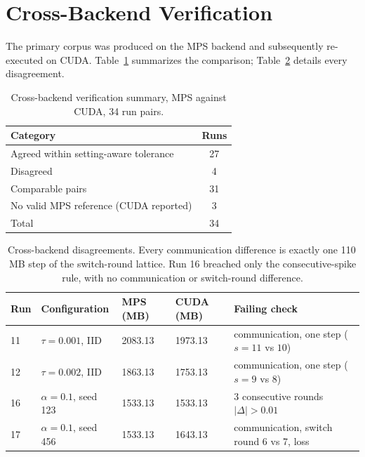 \documentclass{ieeetj}
\begin{document}
\section{Cross-Backend Verification}
\label{app:crossbackend}

The primary corpus was produced on the MPS backend and subsequently re-executed on CUDA. Table~\ref{tab:n3a} summarizes the comparison; Table~\ref{tab:n3b} details every disagreement.

\begin{table}[!t]
\caption{Cross-backend verification summary, MPS against CUDA, 34 run pairs.}
\label{tab:n3a}
\begin{center}
\small
\setlength{\tabcolsep}{4pt}
\begin{tabular}{lc}
\toprule
Category & Runs \\
\midrule
Agreed within setting-aware tolerance & 27 \\
Disagreed & \phantom{0}4 \\
\midrule
Comparable pairs & 31 \\
No valid MPS reference (CUDA reported) & \phantom{0}3 \\
\midrule
Total & 34 \\
\bottomrule
\end{tabular}
\end{center}
\end{table}

\begin{table}[!t]
\caption{Cross-backend disagreements. Every communication difference is exactly one 110\,MB step of the switch-round lattice. Run 16 breached only the consecutive-spike rule, with no communication or switch-round difference.}
\label{tab:n3b}
\begin{center}
\scriptsize
\setlength{\tabcolsep}{3pt}
\begin{tabular}{@{}llp{}p{}p{}@{}}
\toprule
Run & Configuration & MPS (MB) & CUDA (MB) & Failing check \\
\midrule
11 & $\tau{=}0.001$, IID & 2083.13 & 1973.13 & communication, one step ($s{=}11$ vs $10$) \\
12 & $\tau{=}0.002$, IID & 1863.13 & 1753.13 & communication, one step ($s{=}9$ vs $8$) \\
16 & $\alpha{=}0.1$, seed 123 & 1533.13 & 1533.13 & 3 consecutive rounds $|\Delta|>0.01$ \\
17 & $\alpha{=}0.1$, seed 456 & 1533.13 & 1643.13 & communication, switch round 6 vs 7, loss \\
\bottomrule
\end{tabular}
\end{center}
\end{table}
\end{document}
